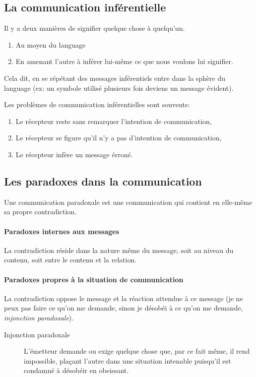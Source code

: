 \documentclass[11pt]{article} %
\begin{document}
	\subsection{La communication inférentielle}

	Il y a deux manières de signifier quelque chose à quelqu'un.
	\begin{enumerate}
		\item Au moyen du language
		\item En amenant l'autre à inférer lui-même ce que nous voulons lui signifier.
	\end{enumerate}

	Cela dit, en se répétant des messages inférentiels entre dans la sphère du language (ex: un symbole utilisé plusieurs fois deviens un message évident).

	Les problèmes de communication inférentielles sont souvents:
	\begin{enumerate}
		\item Le récepteur reste sans remarquer l'intention de communication,
		\item Le récepteur se figure qu'il n'y a pas d'intention de communication,
		\item Le récepteur infère un message érroné.
	\end{enumerate}

	\subsection{Les paradoxes dans la communication}

	Une communication paradoxale est une communication qui contient en elle-même sa propre contradiction.

	\paragraph{Paradoxes internes aux messages} La contradiction réside dans la nature même du message, soit au niveau du contenu, soit entre le contenu et la relation.

	\paragraph{Paradoxes propres à la situation de communication} La contradiction oppose le message et la réaction attendue à ce message (je ne peux pas faire ce qu'on me demande, sinon je désobéi à ce qu'on me demande, \textit{injonction paradoxale}).

	\begin{description}
		\item[Injonction paradoxale] L'émetteur demande ou exige quelque chose que, par ce fait même, il rend impossible, plaçant l'autre dans une situation intenable puisqu'il est condamné à désobéir en obeissant.
 	\end{description}
\end{document}
